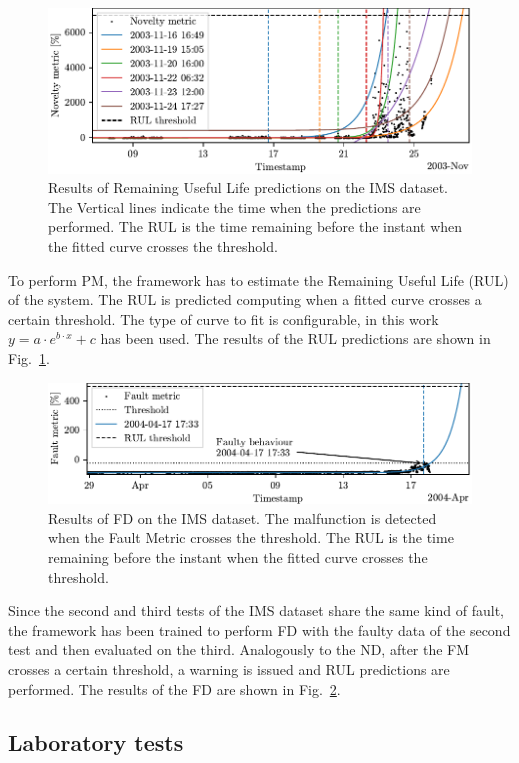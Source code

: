 \begin{figure}
    \includegraphics[width=\linewidth]{images/RUL_IMS.pdf}
    \caption{Results of Remaining Useful Life predictions on the IMS dataset. The Vertical lines indicate the time when the predictions are performed. The RUL is the time remaining before the instant when the fitted curve crosses the threshold.}
    \label{fig:RUL_IMS}
\end{figure}
To perform PM, the framework has to estimate the Remaining Useful Life (RUL) of the system. The RUL is predicted computing when a fitted curve crosses a certain threshold. The type of curve to fit is configurable, in this work $y = a \cdot e^{b \cdot x} + c$ has been used. The results of the RUL predictions are shown in Fig.~\ref{fig:RUL_IMS}.

\begin{figure}
    \includegraphics[width=\linewidth]{images/FD_IMS.pdf}
    \caption{Results of FD on the IMS dataset. The malfunction is detected when the Fault Metric crosses the threshold. The RUL is the time remaining before the instant when the fitted curve crosses the threshold.}
    \label{fig:FD_IMS}
\end{figure}
Since the second and third tests of the IMS dataset share the same kind of fault, the framework has been trained to perform FD with the faulty data of the second test and then evaluated on the third. Analogously to the ND, after the FM crosses a certain threshold, a warning is issued and RUL predictions are performed. The results of the FD are shown in Fig.~\ref{fig:FD_IMS}.

\subsection{Laboratory tests}

